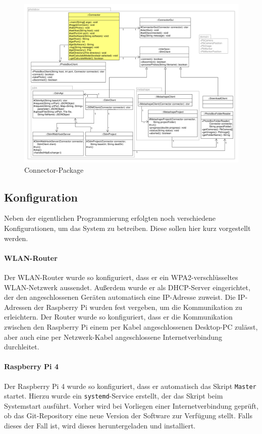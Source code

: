 \documentclass[./00PhotoBox.tex]{subfiles}
\begin{document}
\begin{figure}
    \centering
    \includegraphics[width=1\textwidth]{./img/uml/uml_connector_classdiagramm.pdf}
    \caption{Connector-Package}
    \label{img:uml_connector}
\end{figure}

\subsection{Konfiguration}
Neben der eigentlichen Programmierung erfolgten noch verschiedene Konfigurationen, um das System zu betreiben. Diese sollen hier kurz vorgestellt werden.

\paragraph{WLAN-Router}
Der WLAN-Router wurde so konfiguriert, dass er ein WPA2-ver\-schlüssel\-tes WLAN-Netzwerk aussendet. Außerdem wurde er als DHCP-Server eingerichtet, der den angeschlossenen Geräten au\-to\-ma\-tisch eine IP-Adresse zuweist. Die IP-Adressen der Raspberry Pi wurden fest vergeben, um die Kommunikation zu erleichtern. Der Router wurde so konfiguriert, dass er die Kommunikation zwischen den Raspberry Pi einem per Kabel angeschlossenen Desktop-PC zulässt, aber auch eine per Netzwerk-Kabel angeschlossene Internetverbindung durchleitet.

\paragraph{Raspberry Pi 4}
Der Raspberry Pi 4 wurde so konfiguriert, dass er au\-to\-ma\-tisch das Skript \texttt{Master} startet. Hierzu wurde ein \texttt{systemd}-Service erstellt, der das Skript beim Systemstart ausführt. Vorher wird bei Vorliegen einer Internetverbindung geprüft, ob das Git-Repository eine neue Version der Software zur Verfügung stellt. Falls dieses der Fall ist, wird dieses heruntergeladen und installiert.
\end{document}
